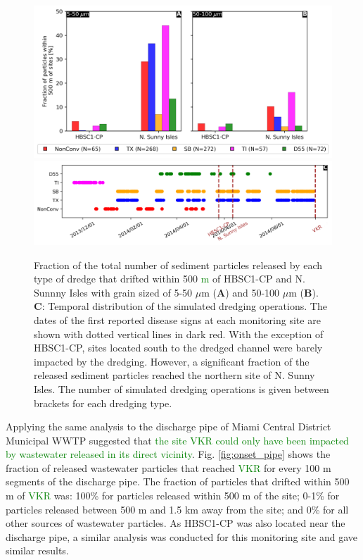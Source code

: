 \documentclass[preprint,12pt,authoryear]{elsarticle}
\newcommand{\modif}[1]{\textcolor{green}{#1}}
\begin{document}
\begin{figure}
	\centering
	\includegraphics[width=\textwidth]{figures/aggregated_new.png}
	\includegraphics[width=\textwidth]{figures/timeline_new.png}
	\caption{Fraction of the total number of sediment particles released by each type of dredge that drifted within 500 \modif{m} of HBSC1-CP and N. Sunnny Isles with grain sized of 5-50 $\mu$m (\textbf{A}) and 50-100 $\mu$m (\textbf{B}). \textbf{C}: Temporal distribution of the simulated dredging operations. The dates of the first reported disease signs at each monitoring site are shown with dotted vertical lines in dark red. With the exception of HBSC1-CP, sites located south to the dredged channel were barely impacted by the dredging. However, a significant fraction of the released sediment particles reached the northern site of N. Sunny Isles. The number of simulated dredging operations is given between brackets for each dredging type.}
	\label{fig:onset_bar}
\end{figure}

Applying the same analysis to the discharge pipe of Miami Central District Municipal WWTP suggested that \modif{the site VKR could only have been impacted by wastewater released in its direct vicinity}. Fig. \ref{fig:onset_pipe} shows the fraction of released wastewater particles that reached \modif{VKR} for every 100 m segments of the discharge pipe. The fraction of particles that drifted within 500 m of \modif{VKR} was: 100\% for particles released within 500 m of the site; 0-1\% for particles released between 500 m and 1.5 km away from the site; and 0\% for all other sources of wastewater particles. As HBSC1-CP was also located near the discharge pipe, a similar analysis was conducted for this monitoring site and gave similar results.
\end{document}
